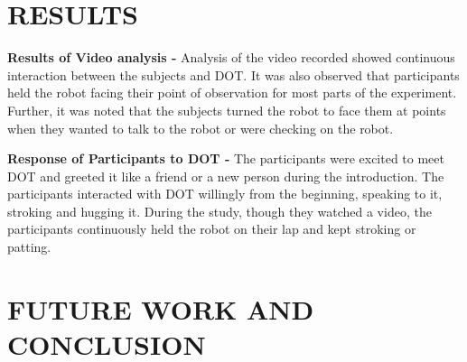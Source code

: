 \documentclass[letterpaper, 10 pt, conference]{ieeeconf}  %
\begin{document}


\section{RESULTS}
\textbf{Results of Video analysis -}
Analysis of the video recorded showed continuous interaction between the subjects and DOT. It was also observed that participants held the robot facing their point of observation for most parts of the experiment. Further, it was noted that the subjects turned the robot to face them at points when they wanted to talk to the robot or were checking on the robot. 


\textbf{Response of Participants to DOT -} The participants were excited to meet DOT and greeted it like a friend or a new person during the introduction. The participants interacted with DOT willingly from the beginning, speaking to it, stroking and hugging it. During the study, though they watched a video, the participants continuously
held the robot on their lap and kept stroking or patting.

\section{FUTURE WORK AND CONCLUSION}
\end{document}
